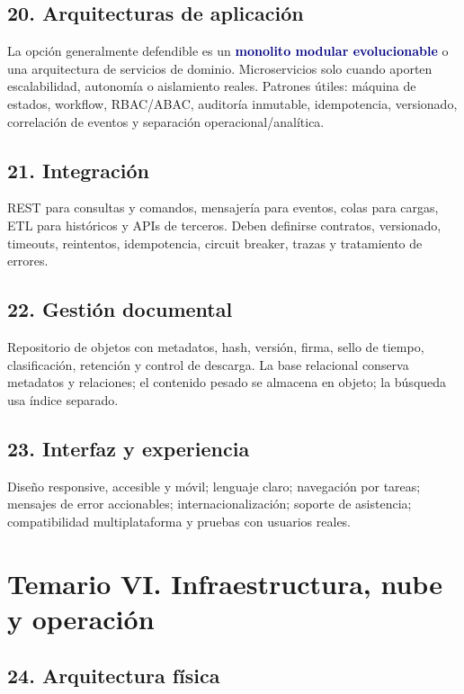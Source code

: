 \documentclass[11pt,a4paper]{article}
\newcommand{\key}[1]{\textbf{\textcolor{navy}{#1}}}
\begin{document}
\subsection{20. Arquitecturas de aplicación}

La opción generalmente defendible es un \key{monolito modular evolucionable} o una arquitectura de servicios de dominio. Microservicios solo cuando aporten escalabilidad, autonomía o aislamiento reales. Patrones útiles: máquina de estados, workflow, RBAC/ABAC, auditoría inmutable, idempotencia, versionado, correlación de eventos y separación operacional/analítica.

\subsection{21. Integración}

REST para consultas y comandos, mensajería para eventos, colas para cargas, ETL para históricos y APIs de terceros. Deben definirse contratos, versionado, timeouts, reintentos, idempotencia, circuit breaker, trazas y tratamiento de errores.

\subsection{22. Gestión documental}

Repositorio de objetos con metadatos, hash, versión, firma, sello de tiempo, clasificación, retención y control de descarga. La base relacional conserva metadatos y relaciones; el contenido pesado se almacena en objeto; la búsqueda usa índice separado.

\subsection{23. Interfaz y experiencia}

Diseño responsive, accesible y móvil; lenguaje claro; navegación por tareas; mensajes de error accionables; internacionalización; soporte de asistencia; compatibilidad multiplataforma y pruebas con usuarios reales.

\section{Temario VI. Infraestructura, nube y operación}

\subsection{24. Arquitectura física}
\end{document}
